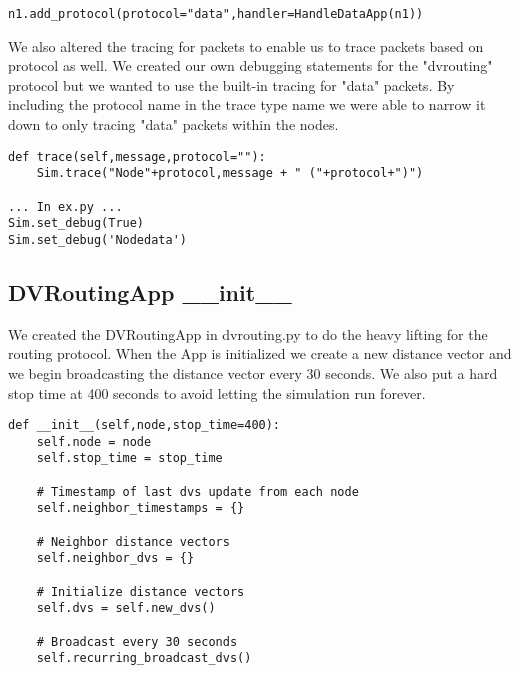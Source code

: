 \documentclass[11pt]{article}
\begin{document}
\vspace{5mm}

\begin{lstlisting}
n1.add_protocol(protocol="data",handler=HandleDataApp(n1))
\end{lstlisting}

\vspace{5mm}

We also altered the tracing for packets to enable us to trace packets based on protocol as well. We created our own debugging statements for the "dvrouting" protocol but we wanted to use the built-in tracing for "data" packets. By including the protocol name in the trace type name we were able to narrow it down to only tracing "data" packets within the nodes.

\vspace{5mm}

\begin{lstlisting}
def trace(self,message,protocol=""):
    Sim.trace("Node"+protocol,message + " ("+protocol+")")

... In ex.py ...
Sim.set_debug(True)
Sim.set_debug('Nodedata')
\end{lstlisting}

\vspace{5mm}

\subsection{DVRoutingApp \_\_init\_\_}

We created the DVRoutingApp in dvrouting.py to do the heavy lifting for the routing protocol. When the App is initialized we create a new distance vector and we begin broadcasting the distance vector every 30 seconds. We also put a hard stop time at 400 seconds to avoid letting the simulation run forever.

\vspace{5mm}

\begin{lstlisting}
def __init__(self,node,stop_time=400):
    self.node = node
    self.stop_time = stop_time

    # Timestamp of last dvs update from each node
    self.neighbor_timestamps = {}

    # Neighbor distance vectors
    self.neighbor_dvs = {}

    # Initialize distance vectors
    self.dvs = self.new_dvs()

    # Broadcast every 30 seconds
    self.recurring_broadcast_dvs()
\end{lstlisting}
\end{document}
